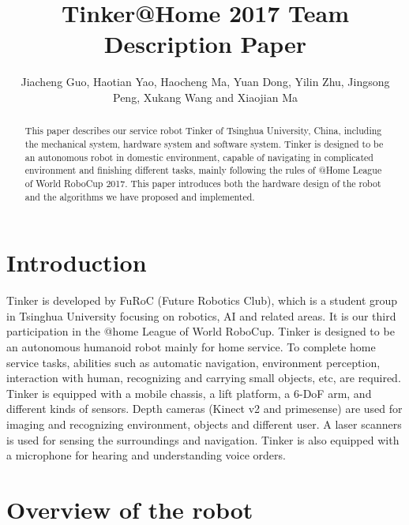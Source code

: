 \documentclass[runningheads,a4paper]{llncs}
\begin{document}
	
\title{Tinker@Home 2017 Team Description Paper}
\author{Jiacheng Guo, Haotian Yao, Haocheng Ma, Yuan Dong, Yilin Zhu, Jingsong Peng, Xukang Wang and Xiaojian Ma}
\maketitle


\begin{abstract}
This paper describes our service robot Tinker of Tsinghua University, China, including the mechanical system, hardware system and software system. Tinker is designed to be an autonomous robot in domestic environment, capable of navigating in complicated environment and finishing different tasks, mainly following the rules of @Home League of World RoboCup 2017. This paper introduces both the hardware design of the robot and the algorithms we have proposed and implemented.
\end{abstract}


\section{Introduction}
Tinker is developed by FuRoC (Future Robotics Club), which is a student group in Tsinghua University focusing on robotics, AI and related areas. It is our third participation in the @home League of World RoboCup. Tinker is designed to be an autonomous humanoid robot mainly for home service. To complete home service tasks, abilities such as automatic navigation, environment perception, interaction with human, recognizing and carrying small objects, etc, are required. Tinker is equipped with a mobile chassis, a lift platform, a 6-DoF arm, and different kinds of sensors. Depth cameras (Kinect v2 and primesense) are used for imaging and recognizing environment, objects and different user. A laser scanners is used for sensing the surroundings and navigation. Tinker is also equipped with a microphone for hearing and understanding voice orders.

\section{Overview of the robot}


\end{document}

